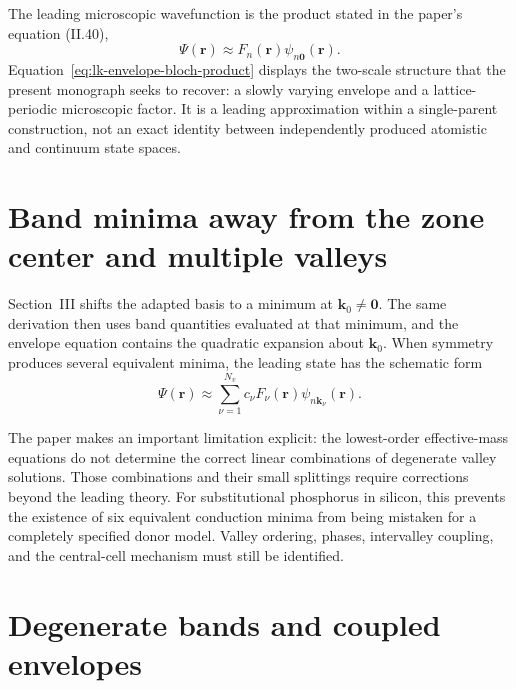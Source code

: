 The leading microscopic wavefunction is the product stated in the paper's
equation (II.40),
\begin{equation}
  \Psi(\mathbf r)
  \approx
  F_n(\mathbf r)\psi_{n\mathbf 0}(\mathbf r).
  \label{eq:lk-envelope-bloch-product}
\end{equation}
Equation~\eqref{eq:lk-envelope-bloch-product} displays the two-scale structure
that the present monograph seeks to recover: a slowly varying envelope and a
lattice-periodic microscopic factor. It is a leading approximation within a
single-parent construction, not an exact identity between independently
produced atomistic and continuum state spaces.

\section{Band minima away from the zone center and multiple valleys}

Section~III shifts the adapted basis to a minimum at
$\mathbf k_0\ne\mathbf 0$. The same derivation then uses band quantities
evaluated at that minimum, and the envelope equation contains the quadratic
expansion about $\mathbf k_0$. When symmetry produces several equivalent
minima, the leading state has the schematic form
\begin{equation}
  \Psi(\mathbf r)
  \approx
  \sum_{\nu=1}^{N_v}
  c_\nu F_\nu(\mathbf r)
  \psi_{n\mathbf k_\nu}(\mathbf r).
  \label{eq:lk-multivalley-state}
\end{equation}

The paper makes an important limitation explicit: the lowest-order
effective-mass equations do not determine the correct linear combinations of
degenerate valley solutions. Those combinations and their small splittings
require corrections beyond the leading theory. For substitutional phosphorus
in silicon, this prevents the existence of six equivalent conduction minima
from being mistaken for a completely specified donor model. Valley ordering,
phases, intervalley coupling, and the central-cell mechanism must still be
identified.

\section{Degenerate bands and coupled envelopes}

